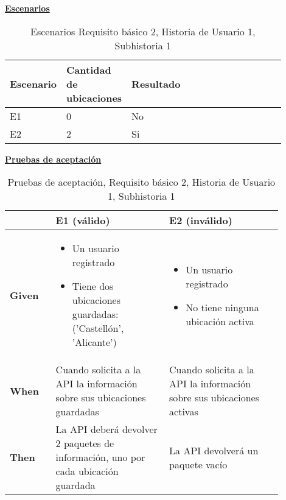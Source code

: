 \documentclass[../ei103948-project-documentation.tex]{subfiles}
\begin{document}
					\begin{center}
						\textbf{\underline{Escenarios}}
						\begin{table}[H]
							\centering
							\begin{tabular}{|p{0.18\linewidth}|p{0.18\linewidth}|p{0.18\linewidth}|p{0.18\linewidth}|p{0.18\linewidth}|}
								\hline
								\textbf{Escenario} & \textbf{Cantidad de ubicaciones} & \textbf{Resultado} \\ \hline
								E1                 & 0                                & No                 \\ \hline
								E2                 & 2                                & Si                 \\ \hline
								\end{tabular}
							\caption{Escenarios Requisito básico 2, Historia de Usuario 1, Subhistoria 1}
						\end{table}

						\descripcionBasicaK

						\newpage
	
						\textbf{\underline{Pruebas de aceptación}}
						\begin{table}[H]
							\centering
							\begin{tabular}{|p{0.15\linewidth}|p{0.37\linewidth}|p{0.37\linewidth}|}
								\hline
								\textbf{}      & \textbf{E1 (válido)}                                                                 & \textbf{E2 (inválido)}                                                \\ \hline
								\textbf{Given} & 
								\begin{itemize}\vspace{-5mm}\setlength\itemsep{0mm}\setlength\parskip{0mm}\setlength{\itemindent}{-5mm}
									\item Un usuario registrado
									\item Tiene dos ubicaciones guardadas: ('Castellón', 'Alicante')
								\end{itemize} & 
								\begin{itemize}\vspace{-5mm}\setlength\itemsep{0mm}\setlength\parskip{0mm}\setlength{\itemindent}{-5mm}
									\item Un usuario registrado
									\item No tiene ninguna ubicación activa
								\end{itemize}             \\ \hline
								\textbf{When}  & Cuando solicita a la API la información sobre sus ubicaciones guardadas              & Cuando solicita a la API la información sobre sus ubicaciones activas \\ \hline
								\textbf{Then}  & La API deberá devolver 2 paquetes de información, uno por cada ubicación guardada & La API devolverá un paquete vacío                                     \\ \hline
								\end{tabular}
							\caption{Pruebas de aceptación, Requisito básico 2, Historia de Usuario 1, Subhistoria 1}
						\end{table}
						\end{center}
\end{document}
